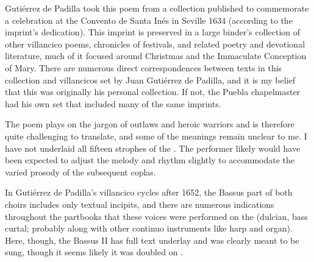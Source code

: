 \begin{notesources}
    \begin{source}
    \end{source}
    \begin{source}
    \end{source}
\end{notesources}

Gutiérrez de Padilla took this poem from a collection published to commemorate
a celebration at the Convento de Santa Inés in Seville 1634 (according to the
imprint's dedication). 
This imprint is preserved in a large binder's collection of other villancico
poems, chronicles of festivals, and related poetry and devotional literature,
much of it focused around Christmas and the Immaculate Conception of Mary.
There are numerous direct correspondences between texts in this collection and
villancicos set by Juan Gutiérrez de Padilla, and it is my belief that this
was originally his personal collection.
If not, the Puebla chapelmaster had his own set that included many of the same
imprints.

The poem plays on the jargon of outlaws and heroic warriors and is therefore
quite challenging to translate, and some of the meanings remain unclear to me.
I have not underlaid all fifteen strophes of the .
The performer likely would have been expected to adjust the melody and rhythm
slightly to accommodate the varied prosody of the subsequent coplas.

In Gutiérrez de Padilla's villancico cycles after 1652, the Bassus part of
both choirs includes only textual incipits, and there are numerous indications
throughout the partbooks that these voices were performed on the 
(dulcian, bass curtal; probably along with other continuo instruments like
harp and organ).
Here, though, the Bassus II has full text underlay and was clearly meant to be
sung, though it seems likely it was doubled on .


\endinput
